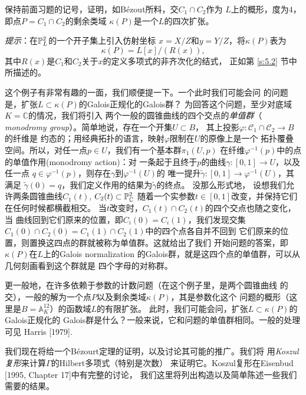 
\begin{exe}\label{exe:3.76}
保持前面习题的记号，证明，如B\'ezout所料，交$C_1\cap C_2$作为
$L$上的概形，度为$4$，即点$P=C_1\cap C_2$的剩余类域
$\kappa(P)$是一个$L$的四次扩张。

\textit{提示}：在$\P_L^2$的一个开子集上引入仿射坐标
$x=X/Z$和$y=Y/Z$，将$\kappa(P)$表为
\[
	\kappa(P)=L[x]/(R(x)),
\]
其中$R(x)$是$C_1$和$C_2$关于$x$的定义多项式的非齐次化的结式，
正如第 \ref{s:5.2} 节中所描述的。
\end{exe}

这个例子有非常有趣的一面，我们顺便提一下。一个此时我们可能会问
的问题是，扩张$L\subset \kappa(P)$的Galois正规化的Galois群？
为回答这个问题，至少对底域$K=\mathbb C$的情况，我们将引入
两个一般的圆锥曲线的四个交点的\textit{单值群}（
\textit{monodromy group}）。简单地说，存在一个开集$U\subset B$，
其上投影$\varphi:\mathscr C_1\cap \mathscr C_2\to B$的纤维是
约态的；用经典拓扑的语言，映射$\varphi$限制在$U$的原像上是一个
拓扑覆叠空间。所以，对任一点$p\in U$，我们有一个基本群$\pi_1(U,p)$
在纤维$\varphi^{-1}(p)$中的点的单值作用(monodromy action)：对
一条起于且终于$p$的曲线$\gamma:[0,1]\to U$，以及任一点
$q\in \varphi^{-1}(p)$，则存在$\gamma$到$\varphi^{-1}(U)$的
唯一提升$\tilde\gamma:[0,1]\to \varphi^{-1}(U)$，其满足
$\tilde\gamma(0)=q$，我们定义作用的结果为$\tilde\gamma$的终点。
没那么形式地，
设想我们允许两条圆锥曲线$C_1(t)$, $C_2(t)\subset \mathbb P_\cc^2$
随着一个实参数$t\in [0,1]$改变，并保持它们在任何时候都横截相交。
当$t$改变时，$C_1(t)\cap C_2(t)$的四个交点也随之变化，当
曲线回到它们原来的位置，即$C_i(0)=C_i(1)$，我们发现交集
$C_1(0)\cap C_2(0)=C_1(1)\cap C_2(1)$中的四个点各自并不回到
它们原来的位置，则置换这四点的群就被称为单值群。这就给出了我们
开始问题的答案，即$\kappa(P)$在$L$上的Galois normalization
的Galois群，就是这四个点的单值群，可以从几何刻画看到这个群就是
四个字母的对称群。

更一般地，在许多依赖于参数的计数问题（在这个例子里，是两个圆锥曲线
的交），一般的解为一个点$P$以及剩余类域$\kappa(P)$，其是参数化这个
问题的概形（这里是$B=\mathbb A_K^{12}$）的函数域$L$的有限扩张。
此时，我们可能会问，扩张$L\subset \kappa(P)$的Galois正规化的
Galois群是什么？一般来说，它和问题的单值群相同。一般的处理可见
Harris [1979].


我们现在将给一个B\'ezourt定理的证明，以及讨论其可能的推广。我们将
用\textit{Koszul复形}来计算$\Gamma$的Hilbert多项式（特别是次数）
来证明它。Koszul复形在Eisenbud [1995, Chapter 17]中有完整的讨论，
我们这里将列出构造以及简单陈述一些我们需要的结果。

